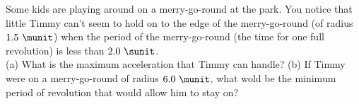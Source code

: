 Some kids are playing around on a merry-go-round at the park. You
notice that little Timmy can't seem to hold on to the edge of the
merry-go-round (of radius $1.5\ \munit$) when the period of the
merry-go-round (the time for one full revolution) is less than 
$2.0\ \sunit$.\\
%
(a) What is the maximum acceleration that Timmy can
handle?\answercheck\hwendpart
%
(b) If Timmy were on a merry-go-round of radius $6.0\ \munit$, what wold be
the minimum period of revolution that would allow him to stay on?\answercheck
